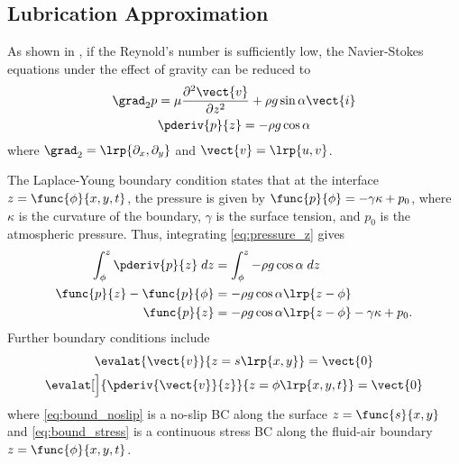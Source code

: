 \subsection{Lubrication Approximation}
As shown in \cite{kondic2003instabilities}, if the Reynold's number is sufficiently low, the Navier-Stokes equations under the effect of gravity can be reduced to 
\begin{gather}
    \grad_2 p = \mu \frac{\partial^2 \vect{v}}{\partial z^2} + \rho g \sin\alpha \vect{i} 
    \label{eq:pressure_grad}\\
    \pderiv{p}{z} = -\rho g \cos \alpha
    \label{eq:pressure_z}
\end{gather}
where $\grad_2 = \lrp{\partial_x, \partial_y}$ and $\vect{v} = \lrp{u, v}$.

The Laplace-Young boundary condition states that at the interface $z = \func{\phi}{x, y, t}$, the pressure is given by 
$\func{p}{\phi} = -\gamma \kappa + p_0$, where $\kappa$ is the curvature of the boundary, $\gamma$ is the surface tension, and $p_0$ is the atmospheric pressure. 
Thus, integrating \cref{eq:pressure_z} gives 
\begin{align}
    \nonumber \int_{\phi}^{z} \pderiv{p}{z} \; dz &=  \int_{\phi}^{z} -\rho g \cos \alpha \; dz\\
    \nonumber \func{p}{z} - \func{p}{\phi} &= -\rho g \cos \alpha \lrp{z - \phi}\\
    \func{p}{z} &= -\rho g \cos \alpha \lrp{z - \phi} -\gamma \kappa + p_0.  
    \label{eq:laplace_young}
\end{align}
Further boundary conditions include 
\begin{gather}
    \evalat{\vect{v}}{z = s\lrp{x,y}} = \vect{0} 
    \label{eq:bound_noslip}\\
    \evalat[\Big]{\pderiv{\vect{v}}{z}}{z = \phi\lrp{x,y,t}} = \vect{0} 
    \label{eq:bound_stress}
\end{gather}
where \cref{eq:bound_noslip} is a no-slip BC along the surface $z = \func{s}{x,y}$ and \cref{eq:bound_stress}
is a continuous stress BC along the fluid-air boundary $z = \func{\phi}{x,y,t}$. 

